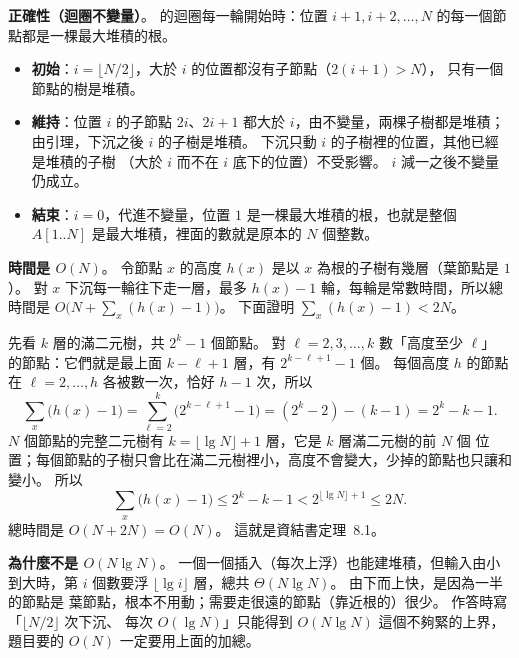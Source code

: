 \begin{pastsoln}
\textbf{正確性（迴圈不變量）}。  的迴圈每一輪開始時：位置
$i + 1, i + 2, \ldots, N$ 的每一個節點都是一棵最大堆積的根。
\begin{itemize}
\item \textbf{初始}：$i = \lfloor N/2 \rfloor$，大於 $i$ 的位置都沒有子節點（$2(i+1) > N$），
只有一個節點的樹是堆積。
\item \textbf{維持}：位置 $i$ 的子節點 $2i$、$2i+1$ 都大於 $i$，由不變量，兩棵子樹都是堆積；
由引理，下沉之後 $i$ 的子樹是堆積。 下沉只動 $i$ 的子樹裡的位置，其他已經是堆積的子樹
（大於 $i$ 而不在 $i$ 底下的位置）不受影響。 $i$ 減一之後不變量仍成立。
\item \textbf{結束}：$i = 0$，代進不變量，位置 $1$ 是一棵最大堆積的根，也就是整個 $A[1..N]$
是最大堆積，裡面的數就是原本的 $N$ 個整數。
\end{itemize}

\textbf{時間是 $O(N)$}。 令節點 $x$ 的高度 $h(x)$ 是以 $x$ 為根的子樹有幾層（葉節點是 $1$）。
對 $x$ 下沉每一輪往下走一層，最多 $h(x) - 1$ 輪，每輪是常數時間，所以總時間是
$O\bigl(N + \sum_x (h(x) - 1)\bigr)$。 下面證明 $\sum_x (h(x) - 1) < 2N$。

先看 $k$ 層的滿二元樹，共 $2^k - 1$ 個節點。 對 $\ell = 2, 3, \ldots, k$ 數「高度至少 $\ell$」
的節點：它們就是最上面 $k - \ell + 1$ 層，有 $2^{k-\ell+1} - 1$ 個。 每個高度 $h$ 的節點在
$\ell = 2, \ldots, h$ 各被數一次，恰好 $h - 1$ 次，所以
\[
\sum_x \bigl(h(x) - 1\bigr) = \sum_{\ell=2}^{k} \bigl(2^{k-\ell+1} - 1\bigr)
= (2^k - 2) - (k - 1) = 2^k - k - 1 .
\]
$N$ 個節點的完整二元樹有 $k = \lfloor \lg N \rfloor + 1$ 層，它是 $k$ 層滿二元樹的前 $N$ 個
位置；每個節點的子樹只會比在滿二元樹裡小，高度不會變大，少掉的節點也只讓和變小。 所以
\[
\sum_x \bigl(h(x) - 1\bigr) \le 2^k - k - 1 < 2^{\lfloor \lg N \rfloor + 1} \le 2N .
\]
總時間是 $O(N + 2N) = O(N)$。 這就是資結書定理~8.1。

\textbf{為什麼不是 $O(N \lg N)$}。 一個一個插入（每次上浮）也能建堆積，但輸入由小到大時，第
$i$ 個數要浮 $\lfloor \lg i \rfloor$ 層，總共 $\Theta(N \lg N)$。 由下而上快，是因為一半的節點是
葉節點，根本不用動；需要走很遠的節點（靠近根的）很少。 作答時寫「$\lfloor N/2 \rfloor$ 次下沉、
每次 $O(\lg N)$」只能得到 $O(N \lg N)$ 這個不夠緊的上界，題目要的 $O(N)$ 一定要用上面的加總。
\end{pastsoln}
